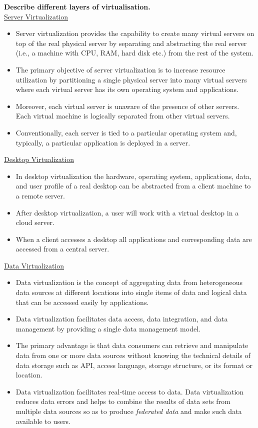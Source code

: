 \documentclass[a4paper, 12pt]{article}
\begin{document}
\textbf{Describe different layers of virtualisation.}\\
\underline{Server Virtualization}
\begin{itemize}
\item
Server virtualization provides the capability to create many virtual servers on top of the real physical server by separating and abstracting the real server (i.e., a machine with CPU, RAM, hard disk etc.) from the rest of the system. 
\item
The primary objective of server virtualization is to increase resource utilization by partitioning a single physical server into many virtual servers where each virtual server has its own operating system and applications.
\item
Moreover, each virtual server is unaware of the presence of other servers. Each virtual machine is logically separated from other virtual servers.
\item
Conventionally, each server is tied to a particular operating system and, typically, a particular application is deployed in a server.
\end{itemize}

\underline{Desktop Virtualization}
\begin{itemize}
\item
In desktop virtualization the hardware, operating system, applications, data, and user profile of a real desktop can be abstracted from a client machine to a remote server.
\item
After desktop virtualization, a user will work with a virtual desktop in a cloud server.
\item
When a client accesses a desktop all applications and corresponding data are accessed from a central server.
\end{itemize}

\underline{Data Virtualization}
\begin{itemize}
\item
Data virtualization is the concept of aggregating data from heterogeneous data sources at different locations into single items of data and logical data that can be accessed easily by applications.
\item
Data virtualization facilitates data access, data integration, and data management by providing a single data management model.
\item
The primary advantage is that data consumers can retrieve and manipulate data from one or more data sources without knowing the technical details of data storage such as API, access language, storage structure, or its format or location.
\item
Data virtualization facilitates real-time access to data. Data virtualization reduces data errors and helps to combine the results of data sets from multiple data sources so as to produce \textit{federated data} and make such data available to users.
\end{itemize}
\end{document}
